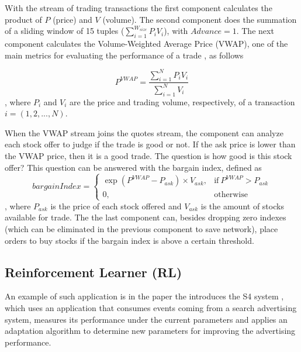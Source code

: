 \documentclass[ppgc,diss,english]{iiufrgs}
\begin{document}
With the stream of trading transactions the first component calculates the product of $P$ (price) and $V$ (volume). The second component does the summation of a sliding window of 15 tuples ($\sum_{i=1}^{W_{size}}P_{i}V_{i}$), with $Advance = 1$. The next component calculates the Volume-Weighted Average Price (VWAP), one of the main metrics for evaluating the performance of a trade \cite{di2010applications, kim2010electronic}, as follows

\begin{equation}
P^{VWAP} = \frac{\sum_{i=1}^{N}P_{i}V_{i}}{\sum_{i=1}^{N}V_{i}}
\end{equation}\cite{kakade2004competitive}, where $P_{i}$ and $V_{i}$ are the price and trading volume, respectively, of a transaction $i = (1,2,...,N)$.

When the VWAP stream joins the quotes stream, the component can analyze each stock offer to judge if the trade is good or not. If the ask price is lower than the VWAP price, then it is a good trade. The question is how good is this stock offer? This question can be answered with the bargain index, defined as
\begin{equation}
bargainIndex = 
\begin{cases}
  \exp(P^{VWAP} - P_{ask}) \times V_{ask}, & \text{if}\ P^{VWAP} > P_{ask} \\
  0, & \text{otherwise}
\end{cases}
\end{equation} \cite{ranganathan2011constructing}, where $P_{ask}$ is the price of each stock offered and $V_{ask}$ is the amount of stocks available for trade. The the last component can, besides dropping zero indexes (which can be eliminated in the previous component to save network), place orders to buy stocks if the bargain index is above a certain threshold.

\subsection{Reinforcement Learner (RL)}


An example of such application is in the paper the introduces the S4 system \cite{neumeyer2010s4}, which uses an application that consumes events coming from a search advertising system, measures its performance under the current parameters and applies an adaptation algorithm to determine new parameters for improving the advertising performance.
\end{document}
